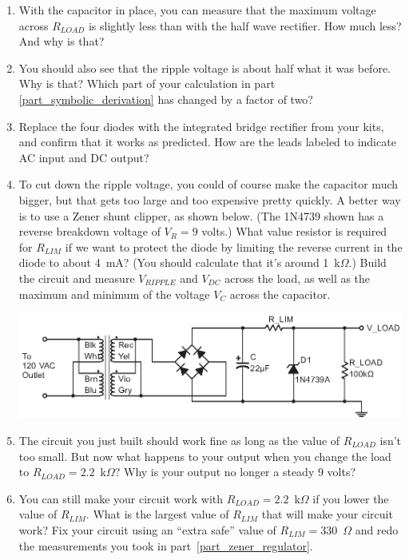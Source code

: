 \begin{enumerate}[wide]
\item With the capacitor in place, you can measure that the maximum voltage across $R_{LOAD}$ is slightly less than with the half wave rectifier.  How much less?  And why is that?

\item You should also see that the ripple voltage is about half what it was before.  Why is that?  Which part of your calculation in part \ref{part_symbolic_derivation} has changed by a factor of two?  

\item Replace the four diodes with the integrated bridge rectifier from your kits, and confirm that it works as predicted.  How are the leads labeled to indicate AC input and DC output?

\item To cut down the ripple voltage, you could of course make the capacitor much bigger, but that gets too large and too expensive pretty quickly.  A better way is to use a Zener shunt clipper, as shown below.  (The 1N4739 shown has a reverse breakdown voltage of $V_R=9$ volts.)  What value resistor is required for $R_{LIM}$ if we want to protect the diode by limiting the reverse current in the diode to about 4~mA?  (You should calculate that it's around 1~k$\Omega$.) Build the circuit and measure $V_{RIPPLE}$ and $V_{DC}$ across the load, as well as the maximum and minimum of the voltage $V_C$ across the capacitor.  \label{part_zener_regulator}
\begin{center}
\includegraphics{power_supply/zener_regulator.eps}
\end{center}

\item The circuit you just built should work fine as long as the value of $R_{LOAD}$ isn't too small.  But now what happens to your output when you change the load to $R_{LOAD} = 2.2$~k$\Omega$?  Why is your output no longer a steady 9 volts?

\item You can still make your circuit work with $R_{LOAD} = 2.2$~k$\Omega$ if you lower the value of $R_{LIM}$.  What is the largest value of $R_{LIM}$ that will make your circuit work?  Fix your circuit using an ``extra safe'' value of $R_{LIM}=330$~$\Omega$ and redo the measurements you took in part~\ref{part_zener_regulator}.  \label{part_small_rlim}


\end{enumerate}
